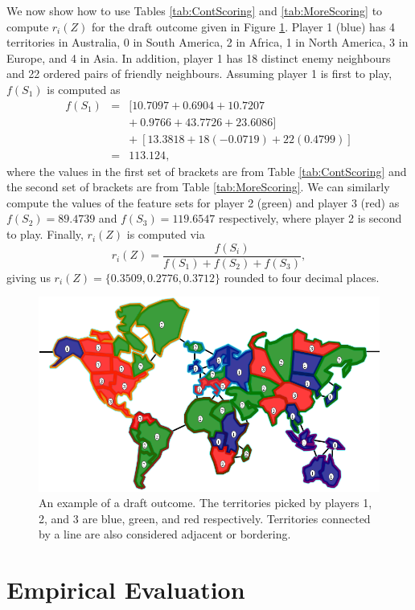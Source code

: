 \documentclass[letterpaper]{article}
\numberwithin{equation}{section}
\numberwithin{theorem}{section}
\numberwithin{lemma}{section}
\numberwithin{df}{section}
\begin{document}
We now show how to use Tables \ref{tab:ContScoring} and \ref{tab:MoreScoring} to compute $r_i(Z)$ for the draft outcome given in Figure \ref{fig:DraftExample}.  Player 1 (blue) has 4 territories in Australia, 0 in South America, 2 in Africa, 1 in North America, 3 in Europe, and 4 in Asia.  In addition, player 1 has 18 distinct enemy neighbours and 22 ordered pairs of friendly neighbours.  Assuming player 1 is first to play, $f(S_1)$ is computed as
\begin{eqnarray*}
 	f(S_1) &=& [10.7097 + 0.6904 + 10.7207 \\ && +\ 0.9766 + 43.7726 + 23.6086] \\ &&+\ [13.3818 + 18(-0.0719) + 22(0.4799)] \\
 				 &=& 113.124,
\end{eqnarray*}
where the values in the first set of brackets are from Table \ref{tab:ContScoring} and the second set of brackets are from Table \ref{tab:MoreScoring}.  We can similarly compute the values of the feature sets for player 2 (green) and player 3 (red) as $f(S_2) = 89.4739$ and $f(S_3) = 119.6547$ respectively, where player 2 is second to play.  Finally, $r_i(Z)$ is computed via
\[ r_i(Z) = \frac{f(S_i)}{f(S_1) + f(S_2) + f(S_3)}, \]
giving us $r_i(Z) = \{0.3509, 0.2776, 0.3712\}$ rounded to four decimal places.

\begin{figure}[t]
	\centering
	\includegraphics[scale=0.3]{figs/DraftExample.png}
	\caption{An example of a draft outcome.  The territories picked by players 1, 2, and 3 are blue, green, and red respectively.  Territories connected by a line are also considered adjacent or bordering.}
	\label{fig:DraftExample}
\end{figure}

\section{Empirical Evaluation}
\end{document}
